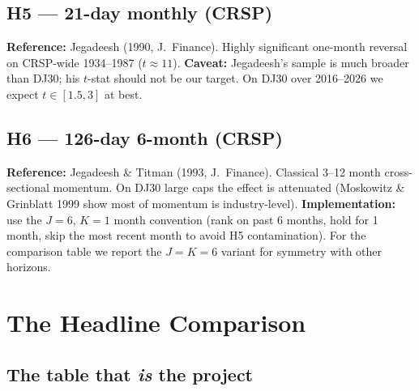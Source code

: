 \documentclass[11pt,letterpaper]{article}
\begin{document}
\subsection{H5 --- 21-day monthly (CRSP)}

\textbf{Reference:} Jegadeesh (1990, J.~Finance). Highly significant one-month reversal on CRSP-wide 1934--1987 ($t\approx 11$). \textbf{Caveat:} Jegadeesh's sample is much broader than DJ30; his $t$-stat should not be our target. On DJ30 over 2016--2026 we expect $t \in [1.5, 3]$ at best.

\subsection{H6 --- 126-day 6-month (CRSP)}

\textbf{Reference:} Jegadeesh \& Titman (1993, J.~Finance). Classical 3--12 month cross-sectional momentum. On DJ30 large caps the effect is attenuated (Moskowitz \& Grinblatt 1999 show most of momentum is industry-level). \textbf{Implementation:} use the $J=6$, $K=1$ month convention (rank on past 6 months, hold for 1 month, skip the most recent month to avoid H5 contamination). For the comparison table we report the $J=K=6$ variant for symmetry with other horizons.

\section{The Headline Comparison}\label{sec:deliverable}

\subsection{The table that \emph{is} the project}
\end{document}
